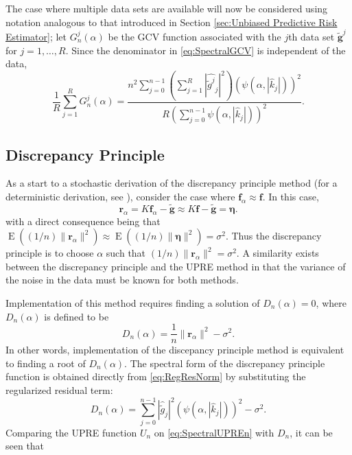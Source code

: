 \documentclass[12pt]{article}
\newcommand{\gnoise}{\widetilde{g}}	%
\newcommand{\gnoiseVec}{\widetilde{\mathbf{g}}}	%
\newcommand{\kMat}{K}	%
\newcommand{\fVec}{\mathbf{f}}	%
\newcommand{\regparam}{\alpha}
\newcommand{\freg}{\fVec_{\regparam}}	%
\newcommand{\mfilt}{\psi}
\newcommand{\noise}{\eta}	%
\newcommand{\noiseSD}{\sigma}	%
\newcommand{\noiseVec}{\bm{\noise}}	%
\DeclareMathOperator{\E}{E}	%
\newcommand{\regres}{\mathbf{r}_{\regparam}}	%
\newcommand{\U}{U}	%
\newcommand{\GCV}{G}	%
\newcommand{\D}{D}	%
\begin{document}
The case where multiple data sets are available will now be considered using notation analogous to that introduced in Section \ref{sec:Unbiased Predictive Risk Estimator}; let $\GCV_n^j(\regparam)$ be the GCV function associated with the $j$th data set $\gnoiseVec^j$ for $j = 1,\ldots,R$. Since the denominator in \eqref{eq:SpectralGCV} is independent of the data,
\begin{equation}
\frac{1}{R}\sum_{j=1}^R \GCV_n^j(\regparam)  = \frac{n^2\sum_{j = 0}^{n-1} \left(\sum_{j=1}^R |\widehat{\gnoise^j}_j|^2\right)(\mfilt(\regparam,|\widehat{k}_j|))^2}{R(\sum_{j = 0}^{n-1} \mfilt(\regparam,|\widehat{k}_j|))^2}.
\label{eq:SpectralGCVsum}
\end{equation}

\subsection{Discrepancy Principle} \label{sec:Discrepancy Principle}
As a start to a stochastic derivation of the discrepancy principle method (for a deterministic derivation, see \cite{Vogel:2002}), consider the case where $\freg \approx \fVec$. In this case,
\[\regres = \kMat\freg - \gnoiseVec \approx \kMat\fVec - \gnoiseVec = \noiseVec.\]
with a direct consequence being that $\E((1/n)\|\regres\|^2) \approx \E((1/n)\|\noiseVec\|^2) =\noiseSD^2$. Thus the discrepancy principle is to choose $\regparam$ such that $(1/n)\|\regres\|^2 = \noiseSD^2$. A similarity exists between the discrepancy principle and the UPRE method in that the variance of the noise in the data must be known for both methods. \par 
Implementation of this method requires finding a solution of $\D_n(\regparam) = 0$, where $\D_n(\regparam)$ is defined to be
\begin{equation}
\label{eq:DP}
\D_n(\regparam) = \frac{1}{n}\|\regres\|^2 - \noiseSD^2.
\end{equation}
In other words, implementation of the discepancy principle method is equivalent to finding a root of $\D_n(\regparam)$. The spectral form of the discrepancy principle function is obtained directly from \eqref{eq:RegResNorm} by substituting the regularized residual term:
\begin{equation}
\D_n(\regparam) = \sum_{j = 0}^{n-1} |\widehat{\gnoise}_j|^2(\mfilt(\regparam,|\widehat{k}_j|))^2 - \noiseSD^2.
\label{eq:SpectralDP}
\end{equation}
Comparing the UPRE function $\U_n$ on \eqref{eq:SpectralUPREn} with $\D_n$, it can be seen that
\end{document}
